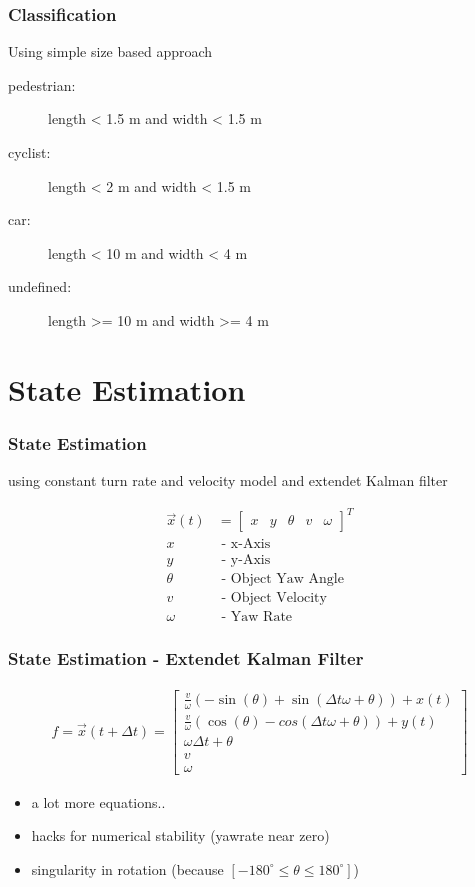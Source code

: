 \documentclass[nosymbols]{beamer}	%
\begin{document}
\begin{frame}
\frametitle{Classification}
Using simple size based approach

\begin{description}
\item[pedestrian:] length < 1.5 m and width < 1.5 m
\item[cyclist:] length < 2 m and width < 1.5 m
\item[car:] length < 10 m and width < 4 m
\item[undefined:] length >= 10 m and width >= 4 m
\end{description}

\end{frame}


\section{State Estimation}	


\begin{frame}
\frametitle{State Estimation}
using constant turn rate and velocity model and extendet Kalman filter

\begin{align*}
\vec{x}(t) &=
\begin{bmatrix}
x & y & \theta & v & \omega
\end{bmatrix}^T\\
x &\text{ - x-Axis}\\
y &\text{ - y-Axis}\\
\theta &\text{ - Object Yaw Angle}\\
v &\text{ - Object Velocity}\\
\omega &\text{ - Yaw Rate}
\end{align*}

\end{frame}


\begin{frame}
\frametitle{State Estimation - Extendet Kalman Filter}
\begin{align*}
f = \vec{x}(t + \Delta t)=
\begin{bmatrix}
\frac{v}{\omega} (-\sin(\theta) + \sin(\Delta t \omega + \theta)) + x(t) \\
\frac{v}{\omega} (\cos(\theta) - cos(\Delta t \omega + \theta)) + y(t) \\
\omega \Delta t + \theta\\
v\\
\omega
\end{bmatrix} 
\end{align*}
\begin{itemize}
\item a lot more equations..
\item hacks for numerical stability (yawrate near zero)
\item singularity in rotation (because $[- 180^{\circ} \le \theta \le 180^{\circ}] $)
\end{itemize}

\end{frame}
\end{document}
